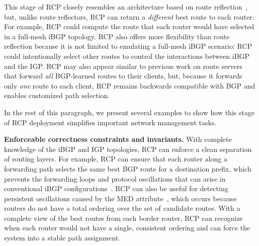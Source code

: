 This stage of RCP closely resembles an architecture based on route
reflection~\cite{rfc2796}, but, unlike route reflectors,
RCP can return a {\em different\/} best route to each router.  For
example, RCP could compute the route that each router would have
selected in a full-mesh iBGP topology.
RCP also offers more
flexibility than route reflection because it is not
limited to emulating a full-mesh iBGP scenario: RCP could
intentionally select other routes to control the interactions between
iBGP and the IGP.
RCP may also appear similar to previous work on route
servers~\cite{rfc1863} that forward {\em all\/} BGP-learned routes to
their clients, but, because it forwards only {\em one\/} route to each
client, RCP remains backwards compatible with BGP and enables
customized path selection.

In the rest of this paragraph, we present several examples to 
show how this stage of RCP deployment simplifies important network
management tasks. 

{\bf Enforceable correctness constraints and invariants.}  With
complete knowledge of the iBGP and IGP topologies, RCP can 
enforce a clean separation of routing layers.  
For example, RCP can ensure that each router along a forwarding
path selects the same best BGP route for a destination prefix, which
prevents the forwarding loops and protocol oscillations that 
can arise in conventional iBGP configurations~\cite{Dube99,Griffin2002}.
%
RCP can also be useful for detecting persistent oscillations caused by
the MED attribute~\cite{Griffin2002b}, which occurs because routers do
not have a total ordering over the set of candidate routes.  With a complete
view of the best routes from each border router, RCP can recognize
when each router would not have a single, consistent ordering and
can force the system into a stable path assignment. 

